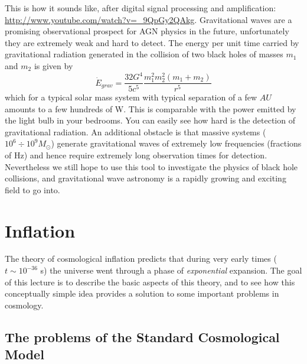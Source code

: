 \documentclass[11pt, a4paper,oneside,openright]{book}
\numberwithin{equation}{section}
\begin{document}
This is how it sounds like, after digital signal processing and amplification: \url{http://www.youtube.com/watch?v=_9QpGy2QAkg}. Gravitational waves are a promising observational prospect for AGN physics in the future, unfortunately they are extremely weak and hard to detect. The energy per unit time carried by gravitational radiation generated in the collision of two black holes of masses $m_1$ and $m_2$ is given by
\begin{equation}
\dot{E}_{grav} = \frac{32G^4}{5c^5}\frac{m_1^2m_2^2(m_1+m_2)}{r^5}
\end{equation} 
which for a typical solar mass system with typical separation of a few $AU$ amounts to a few hundreds of W. This is comparable with the power emitted by the light bulb in your bedrooms. You can easily see how hard is the detection of gravitational radiation. An additional obstacle is that massive systems ($10^6\div 10^9 M_\odot$) generate gravitational waves of extremely low frequencies (fractions of Hz) and hence require extremely long observation times for detection. Nevertheless we still hope to use this tool to investigate the physics of black hole collisions, and gravitational wave astronomy is a rapidly growing and exciting field to go into.


\chapter{Inflation}

The theory of cosmological inflation predicts that during very early times ($t\sim 10^{-36}$ s) the universe went through a phase of {\it exponential} expansion. The goal of this lecture is to describe the basic aspects of this theory, and to see how this conceptually simple idea provides a solution to some important problems in cosmology.

\section{The problems of the Standard Cosmological Model}
\end{document}
